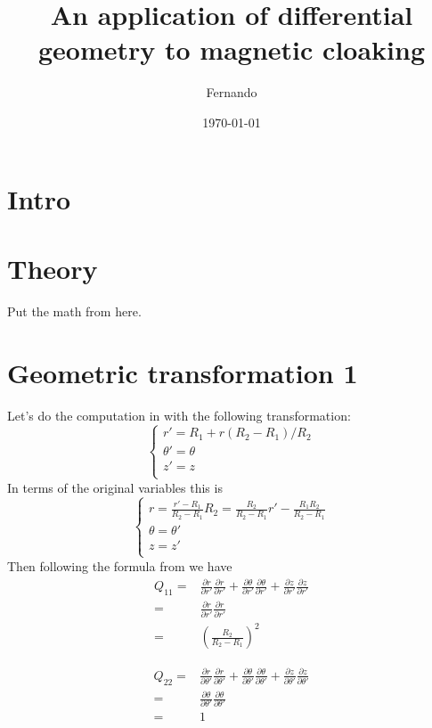 \documentclass{amsart}
\begin{document}
\newcommand{\R}{\mathbb{R}}

\title{An application of differential geometry to magnetic cloaking}
\author{Fernando}
\date{\today}
\maketitle

\section{Intro}
\blindtext[1]
\section{Theory}
Put the math from \cite{ward96} here.

\section{Geometric transformation 1}
Let's do the computation in \cite{ward96} with the following transformation:
\[\begin{cases}
r'=R_1+r(R_2-R_1)/R_2\\
\theta'=\theta\\
z'=z\\
\end{cases}\]
In terms of the original variables this is
\[\begin{cases}
r=\frac{r'-R_1}{R_2-R_1}R_2=\frac{R_2}{R_2-R_1}r'-\frac{R_1R_2}{R_2-R_1}\\
\theta=\theta'\\
z=z'\\
\end{cases}\]
Then following the formula from \cite{ward96} we have
\begin{align*}
Q_{11}
=&\frac{\partial r}{\partial r'}\frac{\partial r}{\partial r'}
+\frac{\partial \theta}{\partial r'}\frac{\partial \theta}{\partial r'}
+\frac{\partial z}{\partial r'}\frac{\partial z}{\partial r'}\\
=&\frac{\partial r}{\partial r'}\frac{\partial r}{\partial r'}\\
=&\left(\frac{R_2}{R_2-R_1}\right)^2
\end{align*}

\begin{align*}
Q_{22}
=&\frac{\partial r}{\partial \theta'}\frac{\partial r}{\partial \theta'}
+\frac{\partial \theta}{\partial \theta'}\frac{\partial \theta}{\partial \theta'}
+\frac{\partial z}{\partial \theta'}\frac{\partial z}{\partial \theta'}\\
=&\frac{\partial \theta}{\partial \theta'}\frac{\partial \theta}{\partial \theta'}\\
=&1
\end{align*}
\end{document}
